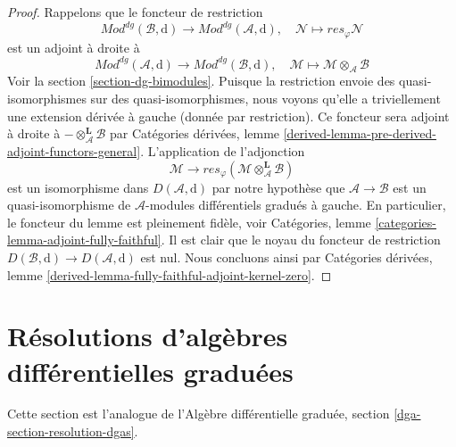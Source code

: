 \begin{proof}
Rappelons que le foncteur de restriction
$$
\textit{Mod}^{dg}(\mathcal{B}, \text{d}) \to
\textit{Mod}^{dg}(\mathcal{A}, \text{d}),\quad
\mathcal{N} \mapsto res_\varphi \mathcal{N}
$$
est un adjoint à droite à
$$
\textit{Mod}^{dg}(\mathcal{A}, \text{d}) \to
\textit{Mod}^{dg}(\mathcal{B}, \text{d}),\quad
\mathcal{M} \mapsto \mathcal{M} \otimes_\mathcal{A} \mathcal{B}
$$
Voir la section \ref{section-dg-bimodules}.
Puisque la restriction envoie des quasi-isomorphismes sur des quasi-isomorphismes, nous voyons qu'elle a triviellement une extension dérivée à gauche (donnée par restriction).
Ce foncteur sera adjoint à droite à $- \otimes_\mathcal{A}^\mathbf{L} \mathcal{B}$ par Catégories dérivées, lemme \ref{derived-lemma-pre-derived-adjoint-functors-general}.
L'application de l'adjonction
$$
\mathcal{M} \to
res_\varphi(\mathcal{M} \otimes_\mathcal{A}^\mathbf{L} \mathcal{B})
$$
est un isomorphisme dans $D(\mathcal{A}, \text{d})$ par notre hypothèse que $\mathcal{A} \to \mathcal{B}$ est un quasi-isomorphisme de $\mathcal{A}$-modules différentiels gradués à gauche.
En particulier, le foncteur du lemme est pleinement fidèle, voir Catégories, lemme \ref{categories-lemma-adjoint-fully-faithful}.
Il est clair que le noyau du foncteur de restriction $D(\mathcal{B}, \text{d}) \to D(\mathcal{A}, \text{d})$ est nul.
Nous concluons ainsi par Catégories dérivées, lemme \ref{derived-lemma-fully-faithful-adjoint-kernel-zero}.
\end{proof}













\section{Résolutions d'algèbres différentielles graduées}
\label{section-resolution-dgas}

\noindent
Cette section est l'analogue de l'Algèbre différentielle graduée, section \ref{dga-section-resolution-dgas}.

